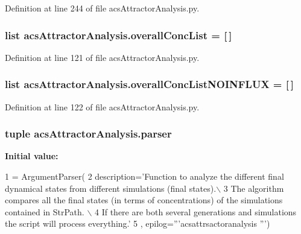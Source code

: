 Definition at line 244 of file acs\+Attractor\+Analysis.\+py.

\hypertarget{a00124_aca1d14f4dbff06c02b0e3e362c7ffe14}{
\subsubsection[{overall\+Conc\+List}]{\setlength{\rightskip}{0pt plus 5cm}list acs\+Attractor\+Analysis.\+overall\+Conc\+List = \mbox{[}$\,$\mbox{]}}}\label{a00124_aca1d14f4dbff06c02b0e3e362c7ffe14}


Definition at line 121 of file acs\+Attractor\+Analysis.\+py.

\hypertarget{a00124_a62444c9b0d66deb07c2e1091695e7561}{
\subsubsection[{overall\+Conc\+List\+N\+O\+I\+N\+F\+L\+U\+X}]{\setlength{\rightskip}{0pt plus 5cm}list acs\+Attractor\+Analysis.\+overall\+Conc\+List\+N\+O\+I\+N\+F\+L\+U\+X = \mbox{[}$\,$\mbox{]}}}\label{a00124_a62444c9b0d66deb07c2e1091695e7561}


Definition at line 122 of file acs\+Attractor\+Analysis.\+py.

\hypertarget{a00124_ab2b01a2d0224ace0cd720a6d807afd0b}{
\subsubsection[{parser}]{\setlength{\rightskip}{0pt plus 5cm}tuple acs\+Attractor\+Analysis.\+parser}}\label{a00124_ab2b01a2d0224ace0cd720a6d807afd0b}
{\bfseries Initial value\+:}
\begin{DoxyCode}
1 = ArgumentParser(
2                                 description=\textcolor{stringliteral}{'Function to analyze the different final dynamical states from
       different simulations (final states).\(\backslash\)}
3 \textcolor{stringliteral}{                                                        The algorithm compares all the final states (in
       terms of concentrations) of the simulations contained in StrPath. \(\backslash\)}
4 \textcolor{stringliteral}{                                                        If there are both several generations and
       simulations the script will process everything.'}
5                                 , epilog=\textcolor{stringliteral}{'''acsattrsactoranalysis '''})
\end{DoxyCode}


